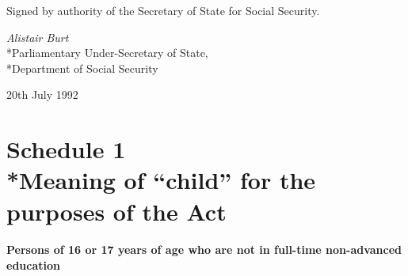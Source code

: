 \documentclass[a4paper,12pt]{article}
\begin{document}
%
%
%
%

\bigskip

Signed by authority of the Secretary of State for Social Security.

{\raggedleft
\emph{Alistair Burt}\\*Parliamentary Under-Secretary of State,\\*Department of Social Security

}

20th July 1992

\small

\part[Schedule 1 --- Meaning of ``child'' for the purposes of the Act]{Schedule 1\\*Meaning of ``child'' for the purposes of the Act}

\renewcommand\parthead{--- Schedule 1}

\subsection*{Persons of 16 or 17 years of age who are not in full-time non-advanced education}
\end{document}
